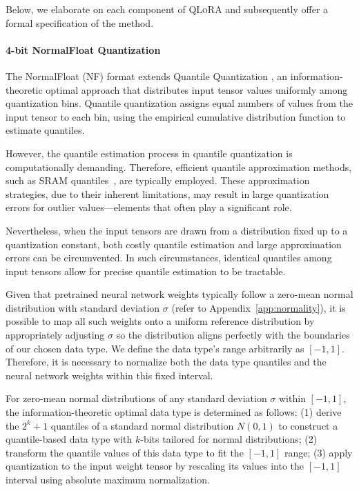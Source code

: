 Below, we elaborate on each component of \textsc{QLoRA} and subsequently offer a formal specification of the method.

\paragraph{4-bit NormalFloat Quantization} The NormalFloat (NF) format extends Quantile Quantization \citep{dettmers2022optimizers}, an information-theoretic optimal approach that distributes input tensor values uniformly among quantization bins. Quantile quantization assigns equal numbers of values from the input tensor to each bin, using the empirical cumulative distribution function to estimate quantiles.

However, the quantile estimation process in quantile quantization is computationally demanding. Therefore, efficient quantile approximation methods, such as SRAM quantiles~\citep{dettmers2022optimizers}, are typically employed. These approximation strategies, due to their inherent limitations, may result in large quantization errors for outlier values—elements that often play a significant role.

Nevertheless, when the input tensors are drawn from a distribution fixed up to a quantization constant, both costly quantile estimation and large approximation errors can be circumvented. In such circumstances, identical quantiles among input tensors allow for precise quantile estimation to be tractable.

Given that pretrained neural network weights typically follow a zero-mean normal distribution with standard deviation $\sigma$ (refer to Appendix~\ref{app:normality}), it is possible to map all such weights onto a uniform reference distribution by appropriately adjusting $\sigma$ so the distribution aligns perfectly with the boundaries of our chosen data type. We define the data type’s range arbitrarily as $[-1, 1]$. Therefore, it is necessary to normalize both the data type quantiles and the neural network weights within this fixed interval.

For zero-mean normal distributions of any standard deviation $\sigma$ within $[-1, 1]$, the information-theoretic optimal data type is determined as follows: (1) derive the $2^k+1$ quantiles of a standard normal distribution $N(0, 1)$ to construct a quantile-based data type with $k$-bits tailored for normal distributions; (2) transform the quantile values of this data type to fit the $[-1, 1]$ range; (3) apply quantization to the input weight tensor by rescaling its values into the $[-1, 1]$ interval using absolute maximum normalization.

